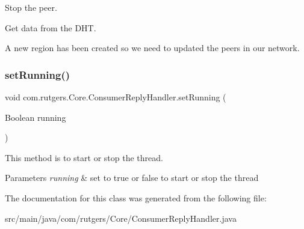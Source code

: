 Stop the peer.

Get data from the D\+HT.

A new region has been created so we need to updated the peers in our network.\mbox{\label{classcom_1_1rutgers_1_1Core_1_1ConsumerReplyHandler_a8a85b5b1100b63a6d713c0bace5086ac}} 
\subsubsection{\texorpdfstring{set\+Running()}{setRunning()}}
{\footnotesize\ttfamily void com.\+rutgers.\+Core.\+Consumer\+Reply\+Handler.\+set\+Running (\begin{DoxyParamCaption}\item[{Boolean}]{running }\end{DoxyParamCaption})}

This method is to start or stop the thread. 
\begin{DoxyParams}{Parameters}
{\em running} & set to true or false to start or stop the thread \\
\hline
\end{DoxyParams}


The documentation for this class was generated from the following file\+:\begin{DoxyCompactItemize}
\item 
src/main/java/com/rutgers/\+Core/Consumer\+Reply\+Handler.\+java\end{DoxyCompactItemize}
